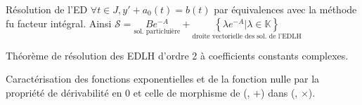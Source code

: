 \documentclass{article}
\begin{document}
\begin{question_kholle}{Résolution de l'ED  $\forall t \in J, y' + a_{0}(t) = b(t)$ par équivalences avec la méthode fu facteur intégral.}
  Ainsi $\mathcal{S} = \underset{\text{sol. particluière}}{Be^{-A}} + \underset{\text{droite vectorielle des sol. de l'EDLH}}{\left\lbrace \lambda e^{-A} | \lambda \in \mathbb{K}\right\rbrace }$
 
\end{question_kholle}

\begin{question_kholle}{Théorème de résolution des EDLH d'ordre 2 à coefficients constants complexes.}

\end{question_kholle}

\begin{question_kholle}{Caractérisation des fonctions exponentielles et de la fonction nulle par la propriété de dérivabilité en 0 et celle de morphisme de (\R, +) dans (\C, $\times$).}
  
\end{question_kholle}
\end{document}
